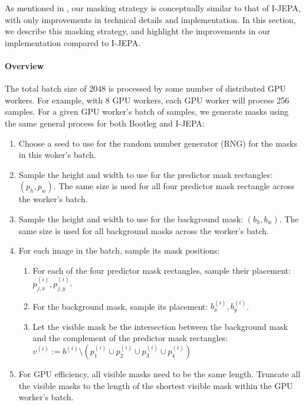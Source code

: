 As mentioned in \iftoggle{arxiv}{\cref{s:method}}{Sec.~4, \textit{``Method''}, of the main paper}, our masking strategy is conceptually similar to that of I-JEPA, with only improvements in technical details and implementation.
In this section, we describe this masking strategy, and highlight the improvements in our implementation compared to I-JEPA.

\paragraph{Overview}

The total batch size of 2048 is processed by some number of distributed GPU workers.
For example, with 8 GPU workers, each GPU worker will process 256 samples.
For a given GPU worker's batch of samples, we generate masks using the same general process for both Bootleg and I-JEPA:
\begin{enumerate}
    \item Choose a seed to use for the random number generator (RNG) for the masks in this woker's batch.
    \item Sample the height and width to use for the predictor mask rectangles: $(p_h, p_w)$. The same size is used for all four predictor mask rectangle across the worker's batch.
    \item Sample the height and width to use for the background mask: $(b_h, b_w)$. The same size is used for all background masks across the worker's batch.
    \item For each image in the batch, sample its mask positions:
    \begin{enumerate}
        \item For each of the four predictor mask rectangles, sample their placement: $p^{(i)}_{j,x}, p^{(i)}_{j,y}$.
        \item For the background mask, sample its placement: $b^{(i)}_x, b^{(i)}_y$.
        \item Let the visible mask be the intersection between the background mask and the complement of the predictor mask rectangles: $v^{(i)} := b^{(i)} \setminus (p^{(i)}_1 \cup p^{(i)}_2 \cup p^{(i)}_3 \cup p^{(i)}_4)$
    \end{enumerate}
    \item For GPU efficiency, all visible masks need to be the same length. Truncate all the visible masks to the length of the shortest visible mask within the GPU worker's batch.
\end{enumerate}

